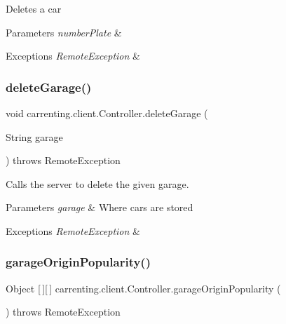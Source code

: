 Deletes a car


\begin{DoxyParams}{Parameters}
{\em number\+Plate} & \\
\hline
\end{DoxyParams}

\begin{DoxyExceptions}{Exceptions}
{\em Remote\+Exception} & \\
\hline
\end{DoxyExceptions}
\mbox{\label{classcarrenting_1_1client_1_1_controller_a41f7110cdb9a72be3de30b5ddd7ac8e3}} 
\subsubsection{\texorpdfstring{deleteGarage()}{deleteGarage()}}
{\footnotesize\ttfamily void carrenting.\+client.\+Controller.\+delete\+Garage (\begin{DoxyParamCaption}\item[{String}]{garage }\end{DoxyParamCaption}) throws Remote\+Exception}

Calls the server to delete the given garage.


\begin{DoxyParams}{Parameters}
{\em garage} & Where cars are stored \\
\hline
\end{DoxyParams}

\begin{DoxyExceptions}{Exceptions}
{\em Remote\+Exception} & \\
\hline
\end{DoxyExceptions}
\mbox{\label{classcarrenting_1_1client_1_1_controller_a26fcc1a9b0108dc2283436a34db76c30}} 
\subsubsection{\texorpdfstring{garageOriginPopularity()}{garageOriginPopularity()}}
{\footnotesize\ttfamily Object \mbox{[}$\,$\mbox{]}\mbox{[}$\,$\mbox{]} carrenting.\+client.\+Controller.\+garage\+Origin\+Popularity (\begin{DoxyParamCaption}{ }\end{DoxyParamCaption}) throws Remote\+Exception}

